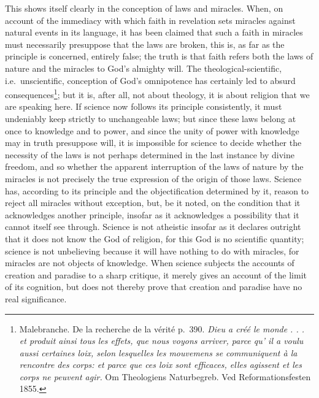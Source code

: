 \documentclass[12pt,a4paper]{article}
\newcommand{\opage}[1]{\marginnote{\footnotesize\textit{[#1]}}}
\begin{document}
This shows itself clearly in the conception of laws and miracles.
When, on account of the immediacy with which faith in revelation sets
miracles against natural events in its language, it has been claimed
that such a faith in miracles must necessarily presuppose that the laws
are broken, this is, as far as the principle is concerned, entirely
false; the truth is that faith refers both the laws of nature and the
miracles to God's almighty will. The theological-scientific, i.e.\
unscientific, conception of God's omnipotence has certainly led to
absurd consequences\footnote{Malebranche. De la recherche de la vérité p.\ 390. \textit{Dieu a créé le
monde . . . et produit ainsi tous les effets, que nous voyons arriver,
parce qu’ il a voulu aussi certaines loix, selon lesquelles les mouvemens
se communiquent à la rencontre des corps: et parce que ces loix sont
efficaces, elles agissent et les corps ne peuvent agir.} Om Theologiens
Naturbegreb. Ved Reformationsfesten 1855.}; %
but it is, after all, not
\opage{45}about theology, it is about religion that we are speaking here. If
science now follows its principle consistently, it must undeniably keep
strictly to unchangeable laws; but since these laws belong at once to
knowledge and to power, and since the unity of power with knowledge may
in truth presuppose will, it is impossible for science to decide whether
the necessity of the laws is not perhaps determined in the last instance
by divine freedom, and so whether the apparent interruption of the laws
of nature by the miracles is not precisely the true expression of the
origin of those laws. Science has, according to its principle and the
objectification determined by it, reason to reject all miracles without
exception, but, be it noted, on the condition that it acknowledges
another principle, insofar as it acknowledges a possibility that it
cannot itself see through. Science is not atheistic insofar as it
declares outright that it does not know the God of religion, for this
God is no scientific quantity; science is not unbelieving because it will
have nothing to do with miracles, for miracles are not objects of
knowledge. When science subjects the accounts of creation and paradise to
a sharp critique, it merely gives an account of the limit of its
cognition, but does not thereby prove that creation and paradise have no
real significance.
\end{document}
